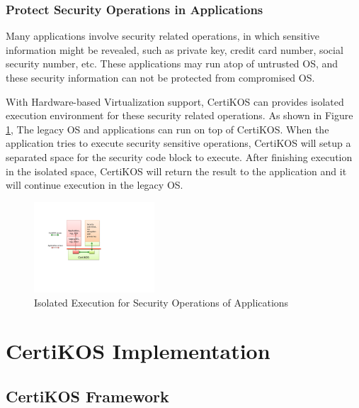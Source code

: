 \documentclass[a4paper,12pt]{article}
\begin{document}
\subsubsection{Protect Security Operations in Applications}
Many applications involve security related operations, in which sensitive information might be revealed, such as private key, credit card number,  social security number, etc. These applications may run atop of untrusted OS, and these security information can not be protected from compromised OS. 

With Hardware-based Virtualization support, CertiKOS can provides isolated execution environment for these security related operations.  As shown in Figure \ref{fig:sandbox}, The legacy OS and applications can run on top of CertiKOS.  When the application tries to execute security sensitive operations,  CertiKOS  will setup a separated space for the security code block to execute.  After finishing execution in the isolated space, CertiKOS will return the result to the application and it  will continue execution in the legacy OS. 



\begin{figure}[!ht]
 \centerline{
 \includegraphics[width=0.4\textwidth]{certikos_sandbox}}
 \caption{Isolated Execution for Security Operations of Applications} \label{fig:sandbox}
\end{figure}

\section{CertiKOS Implementation}

\subsection{CertiKOS Framework}
\end{document}
